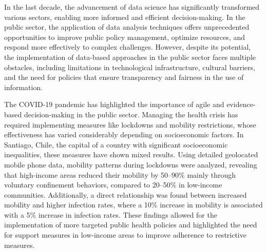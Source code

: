 \begin{intro}
    
    In the last decade, the advancement of data science has significantly transformed various sectors, enabling more informed and efficient decision-making. In the public sector, the application of data analysis techniques offers unprecedented opportunities to improve public policy management, optimize resources, and respond more effectively to complex challenges. However, despite its potential, the implementation of data-based approaches in the public sector faces multiple obstacles, including limitations in technological infrastructure, cultural barriers, and the need for policies that ensure transparency and fairness in the use of information.

    The COVID-19 pandemic has highlighted the importance of agile and evidence-based decision-making in the public sector. Managing the health crisis has required implementing measures like lockdowns and mobility restrictions, whose effectiveness has varied considerably depending on socioeconomic factors. In Santiago, Chile, the capital of a country with significant socioeconomic inequalities, these measures have shown mixed results. Using detailed geolocated mobile phone data, mobility patterns during lockdowns were analyzed, revealing that high-income areas reduced their mobility by 50–90\% mainly through voluntary confinement behaviors, compared to 20–50\% in low-income communities. Additionally, a direct relationship was found between increased mobility and higher infection rates, where a 10\% increase in mobility is associated with a 5\% increase in infection rates. These findings allowed for the implementation of more targeted public health policies and highlighted the need for support measures in low-income areas to improve adherence to restrictive measures.
    

\end{intro}
